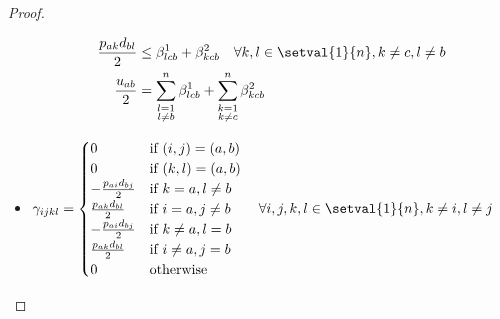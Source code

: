 \begin{proof}
\begin{itemize}
\begin{align}
\begin{aligned}
					\frac{p_{ak}d_{bl}}{2}&\leq \beta^1_{lcb}+\beta^2_{kcb}\quad\forall k,l\in\setval{1}{n}, k\neq c, l\neq b\\
					\frac{u_{ab}}{2}&=\sum_{\substack{l=1\\l\neq b}}^n\beta^1_{lcb} + \sum_{\substack{k=1\\k\neq c}}^n\beta^2_{kcb}
				\end{aligned}
			\end{align}
		\item $\gamma_{ijkl} =
			\begin{cases}
				0&\text{if }(i,j) = (a,b)\\
				0&\text{if }(k,l) = (a,b)\\
				-\frac{p_{ai}d_{bj}}{2}&\text{if }k = a, l \neq b\\
				\frac{p_{ak}d_{bl}}{2}&\text{if }i = a, j \neq b\\
				-\frac{p_{ai}d_{bj}}{2}&\text{if }k \neq a, l = b\\
				\frac{p_{ak}d_{bl}}{2}&\text{if }i \neq a, j = b\\
				0&\text{otherwise}
			\end{cases}
			\quad\forall i,j,k,l\in\setval{1}{n}, k\neq i, l\neq j$
	\end{itemize}
	

\end{proof}
